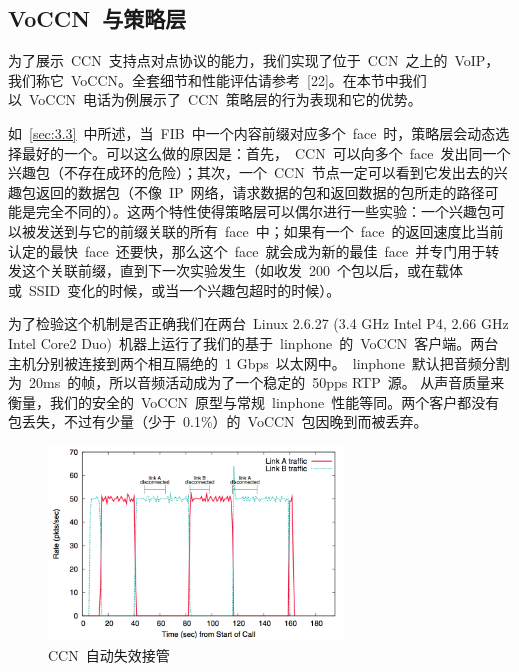 \subsection{VoCCN~与策略层}
\label{sec:6.3}
为了展示~CCN~支持点对点协议的能力，我们实现了位于~CCN~之上的~VoIP，我们称它~VoCCN。全套细节和性能评估请参考~[22]。在本节中我们以~VoCCN~电话为例展示了~CCN~策略层的行为表现和它的优势。

如~\ref{sec:3.3}~中所述，当~FIB~中一个内容前缀对应多个~face~时，策略层会动态选择最好的一个。可以这么做的原因是：首先，~CCN~可以向多个~face~发出同一个兴趣包（不存在成环的危险）；其次，一个~CCN~节点一定可以看到它发出去的兴趣包返回的数据包（不像~IP~网络，请求数据的包和返回数据的包所走的路径可能是完全不同的）。这两个特性使得策略层可以偶尔进行一些实验：一个兴趣包可以被发送到与它的前缀关联的所有~face~中；如果有一个~face~的返回速度比当前认定的最快~face~还要快，那么这个~face~就会成为新的最佳~face~并专门用于转发这个关联前缀，直到下一次实验发生（如收发~200~个包以后，或在载体或~SSID~变化的时候，或当一个兴趣包超时的时候）。

为了检验这个机制是否正确我们在两台~Linux 2.6.27 (3.4 GHz Intel P4, 2.66 GHz Intel Core2 Duo)~机器上运行了我们的基于~linphone~的~VoCCN~客户端。两台主机分别被连接到两个相互隔绝的~1 Gbps~以太网中。~linphone~默认把音频分割为~20ms~的帧，所以音频活动成为了一个稳定的~50pps RTP~源。
从声音质量来衡量，我们的安全的~VoCCN~原型与常规~linphone~性能等同。两个客户都没有包丢失，不过有少量（少于~0.1\%）的~VoCCN~包因晚到而被丢弃。

\begin{figure}[htbp]
\begin{center}
\includegraphics[width=0.7\textwidth]{images/failover}
\caption{CCN~自动失效接管}
\label{failover}
\end{center}
\end{figure}

